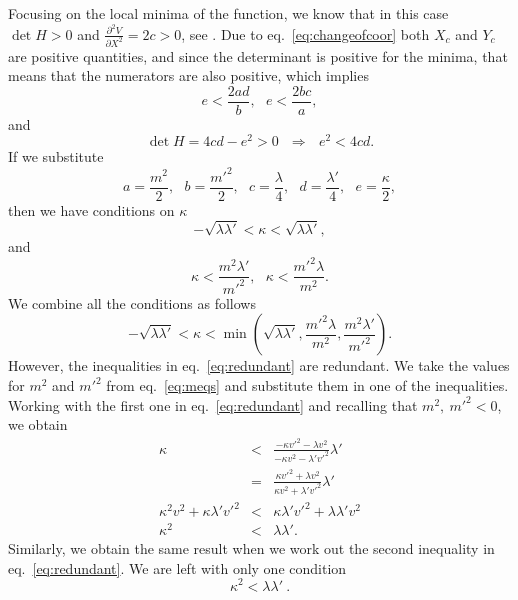 Focusing on the local minima of the function, we know that in this case $\det H>0$ and $\frac{\partial^2 V}{\partial X^2} = 2c > 0$, see \cite{Marsden2012}. Due to eq.\ \eqref{eq:changeofcoor} both $X_c$ and $Y_c$ are positive quantities, and since the determinant is positive for the minima, that means that the numerators are also positive, which implies
\begin{equation}
	e<\frac{2ad}{b} ,\ \ \ e<\frac{2bc}{a},
\end{equation}
and
\begin{equation}
	\det H = 4cd - e^2 > 0 \ \ \ \Rightarrow  \ \ \ e^2 < 4cd.
\end{equation}
If we substitute
$$a = \frac{m^2}{2}, \ \ \  b = \frac{m'^2}{2}, \ \ \  c = \frac{\lambda}{4}, \ \ \  d = \frac{\lambda'}{4}, \ \ \ e = \frac{\kappa}{2},$$
then we have conditions on $\kappa$
\begin{equation}
-\sqrt{\lambda \lambda'} < \kappa < \sqrt{\lambda \lambda'},
\end{equation}
and
\begin{equation}
	{\kappa} < \frac{m^2\lambda'}{m'^2}, \ \ \ {\kappa} < \frac{m'^2\lambda}{m^2}.
	\label{eq:redundant}
\end{equation}
We combine all the conditions as follows
\begin{equation}
	-\sqrt{\lambda \lambda'} < \kappa < \min \left(\sqrt{\lambda \lambda'},\frac{m'^2\lambda}{m^2},\frac{m^2\lambda'}{m'^2}\right).
\end{equation}
However, the inequalities in eq.\ \eqref{eq:redundant} are redundant. We take the values for $m^2$ and $m'^2$ from eq.\ \eqref{eq:meqs} and substitute them in one of the inequalities. Working with the first one in  eq.\ \eqref{eq:redundant} and recalling that $m^2,\ m'^2 <0$, we obtain
\begin{eqnarray}
	{\kappa} & < & \frac{-\kappa v'^2 - \lambda v^2}{-\kappa v^2 - \lambda' v'^2}\lambda'\nonumber \\
	& = & \frac{\kappa v'^2 + \lambda v^2}{\kappa v^2 + \lambda' v'^2}\lambda' \nonumber \\
	\kappa^2v^2+\kappa\lambda' v'^2 & < & \kappa\lambda' v'^2 + \lambda\lambda' v^2 \nonumber\\
	\kappa^2 & < & \lambda\lambda'. 
\end{eqnarray}
Similarly, we obtain the same result when we work out the second inequality in eq.\ \eqref{eq:redundant}. We are left with only one condition
\begin{equation}
 \boxed{\kappa^2 < \lambda \lambda'}\ .
\end{equation}


